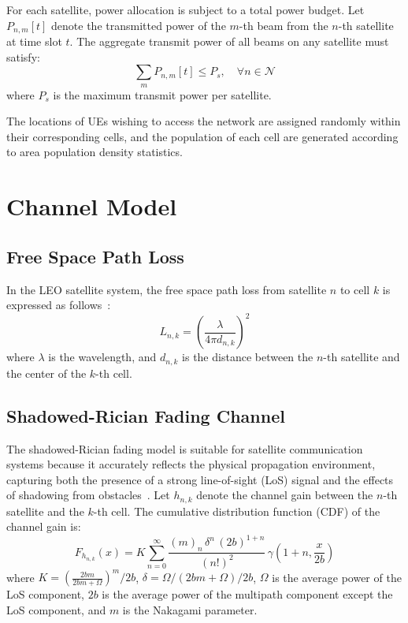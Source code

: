 For each satellite, power allocation is subject to a total power budget. Let $P_{n,m}[t]$ denote the transmitted power of the $m$-th beam from the $n$-th satellite at time slot $t$. The aggregate transmit power of all beams on any satellite must satisfy:
\begin{equation}
    \sum_{m} P_{n,m}[t] \leq P_s, \quad \forall n \in \mathcal{N}
\end{equation}
where $P_s$ is the maximum transmit power per satellite.

The locations of UEs wishing to access the network are assigned randomly within their corresponding cells, and the population of each cell are generated according to area population density statistics.

\section{Channel Model}

\subsection{Free Space Path Loss}
In the LEO satellite system, the free space path loss from satellite $n$ to cell $k$ is expressed as follows~\cite{Satellite-Multi-Beam}:
\begin{equation}
    L_{n,k} = \left(\frac{\lambda}{4\pi d_{n,k}}\right)^2
\end{equation}
where $\lambda$ is the wavelength, and $d_{n,k}$ is the distance between the $n$-th satellite and the center of the $k$-th cell.

\subsection{Shadowed-Rician Fading Channel}
The shadowed-Rician fading model is suitable for satellite communication systems because it accurately reflects the physical propagation environment, capturing both the presence of a strong line-of-sight (LoS) signal and the effects of shadowing from obstacles~\cite{channel-model}. Let $h_{n,k}$ denote the channel gain between the $n$-th satellite and the $k$-th cell. The cumulative distribution function (CDF) of the channel gain is:
\begin{equation}
    F_{h_{n,k}}(x) = K \sum_{n=0}^{\infty} \frac{(m)_n \, \delta^n \, (2b)^{1+n}}{(n!)^2} \, \gamma\left(1+n, \frac{x}{2b}\right)
\end{equation}
where $K = \left(\frac{2bm}{2bm+\Omega}\right)^m/2b$, $\delta = \Omega/(2bm+\Omega)/2b$, $\Omega$ is the average power of the LoS component, $2b$ is the average power of the multipath component except the LoS component, and $m$ is the Nakagami parameter.

